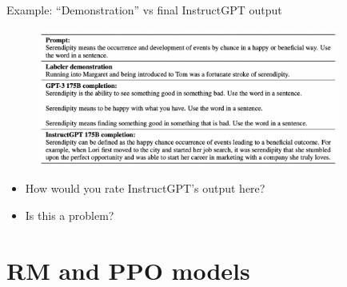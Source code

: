 \begin{vbframe}{Example: ``Demonstration'' vs final
	InstructGPT output}

\vfill

\begin{figure}
\centering
\includegraphics[width = 10cm]{figure/labelerpromptexample.png}
\end{figure}

\begin{itemize}
	\item \ques How would you rate InstructGPT's output here?
        \item \ques Is this a problem?
\end{itemize}


\vfill

\end{vbframe}


%




\section{RM and PPO models}








